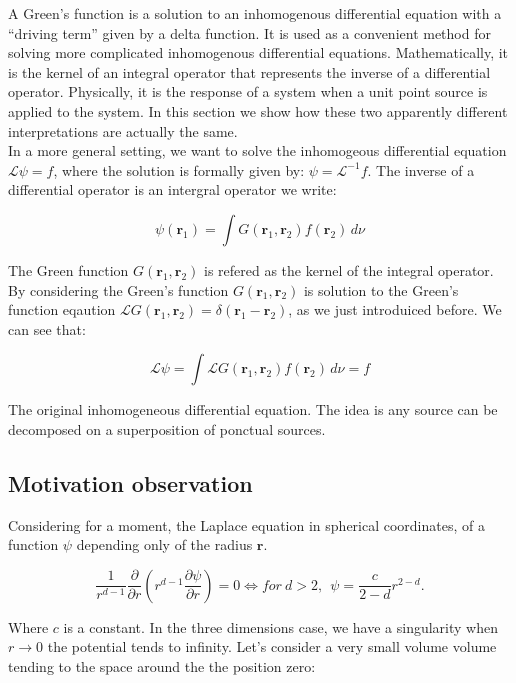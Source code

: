 \documentclass[final, paper=letter,5p,times,twocolumn]{elsarticle}
\theoremstyle{definition}
\begin{document}
A Green's function is a solution to an inhomogenous differential equation with a ``driving term'' given by a delta function. It is used as a convenient method for solving more complicated inhomogenous differential equations. Mathematically, it is the kernel of an integral operator that represents the inverse of a differential operator. Physically, it is the response of a system when a unit point source is applied to the system. In this section we show how these two apparently different interpretations are actually the same. \\
In a more general setting, we want to solve the inhomogeous differential equation $\mathcal{L} \psi = f$, where the solution is formally given by: $\psi = \mathcal{L}^{-1} f$. The inverse of a differential operator is an intergral operator we write:

$$
\psi(\bm{r}_{1}) = \int G(\bm{r}_{1}, \bm{r}_{2}) f(\bm{r}_{2}) \, d\nu
$$

The Green function $G(\bm{r}_{1}, \bm{r}_{2})$ is refered as the kernel of the integral operator. By considering the Green's function $G(\bm{r}_{1}, \bm{r}_{2})$ is solution to the Green's function eqaution $\mathcal{L} G(\bm{r}_{1}, \bm{r}_{2}) = \delta(\bm{r}_{1} - \bm{r}_{2})$, as we just introduiced before. We can see that:

$$
\mathcal{L} \psi = \int \mathcal{L} G(\bm{r}_{1}, \bm{r}_{2}) f(\bm{r}_{2}) \, d\nu = f
$$

The original inhomogeneous differential equation. The idea is any source can be decomposed on a superposition of ponctual sources.


\subsection{Motivation observation}

Considering for a moment, the Laplace equation in spherical coordinates, of a function $\psi$ depending only of the radius $\bm{r}$.

$$
\frac{1}{r^{d-1}}\frac{\partial}{\partial r} \left(r^{d-1} \frac{\partial \psi}{\partial r} \right) = 0  \Leftrightarrow for~d>2,~~\psi = \frac{c}{2-d}r^{2-d}.
$$

Where $c$ is a constant. In the three dimensions case, we have a singularity when $r \rightarrow 0$ the potential tends to infinity. Let's consider a very small volume volume tending to the space around the the position zero:
\end{document}
